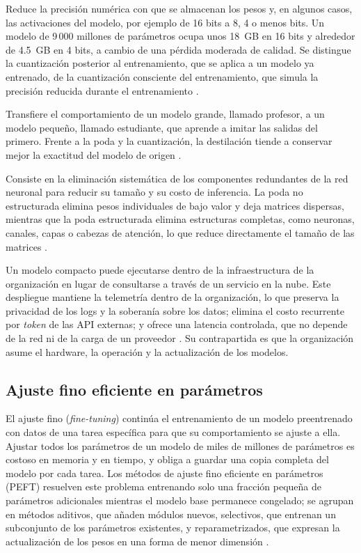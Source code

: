Reduce la precisión numérica con que se almacenan los pesos y, en algunos casos, las activaciones del modelo, por ejemplo de 16 bits a 8, 4 o menos bits. Un modelo de 9\,000 millones de parámetros ocupa unos 18~GB en 16 bits y alrededor de 4.5~GB en 4 bits, a cambio de una pérdida moderada de calidad. Se distingue la cuantización posterior al entrenamiento, que se aplica a un modelo ya entrenado, de la cuantización consciente del entrenamiento, que simula la precisión reducida durante el entrenamiento \cite{wang2025_slm_survey}.

Transfiere el comportamiento de un modelo grande, llamado profesor, a un modelo pequeño, llamado estudiante, que aprende a imitar las salidas del primero. Frente a la poda y la cuantización, la destilación tiende a conservar mejor la exactitud del modelo de origen \cite{yang2025_lightweight}.

Consiste en la eliminación sistemática de los componentes redundantes de la red neuronal para reducir su tamaño y su costo de inferencia. La poda no estructurada elimina pesos individuales de bajo valor y deja matrices dispersas, mientras que la poda estructurada elimina estructuras completas, como neuronas, canales, capas o cabezas de atención, lo que reduce directamente el tamaño de las matrices \cite{wang2025_slm_survey}.

Un modelo compacto puede ejecutarse dentro de la infraestructura de la organización en lugar de consultarse a través de un servicio en la nube. Este despliegue mantiene la telemetría dentro de la organización, lo que preserva la privacidad de los logs y la soberanía sobre los datos; elimina el costo recurrente por \textit{token} de las API externas; y ofrece una latencia controlada, que no depende de la red ni de la carga de un proveedor \cite{pardeshi2026_smartllm}. Su contrapartida es que la organización asume el hardware, la operación y la actualización de los modelos.

\subsection{Ajuste fino eficiente en parámetros}\label{sec:mt_peft}

El ajuste fino (\textit{fine-tuning}) continúa el entrenamiento de un modelo preentrenado con datos de una tarea específica para que su comportamiento se ajuste a ella. Ajustar todos los parámetros de un modelo de miles de millones de parámetros es costoso en memoria y en tiempo, y obliga a guardar una copia completa del modelo por cada tarea. Los métodos de ajuste fino eficiente en parámetros (PEFT) resuelven este problema entrenando solo una fracción pequeña de parámetros adicionales mientras el modelo base permanece congelado; se agrupan en métodos aditivos, que añaden módulos nuevos, selectivos, que entrenan un subconjunto de los parámetros existentes, y reparametrizados, que expresan la actualización de los pesos en una forma de menor dimensión \cite{han2024_peft_survey}.

